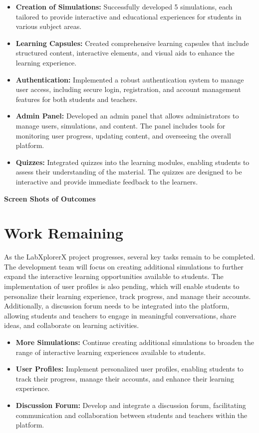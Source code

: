 \begin{itemize}[leftmargin=1cm]
    \item \textbf{Creation of Simulations:} Successfully developed 5 simulations, each tailored to provide interactive and educational experiences for students in various subject areas.
    
    \item \textbf{Learning Capsules:} Created comprehensive learning capsules that include structured content, interactive elements, and visual aids to enhance the learning experience.
    
    \item \textbf{Authentication:} Implemented a robust authentication system to manage user access, including secure login, registration, and account management features for both students and teachers.
    
    \item \textbf{Admin Panel:} Developed an admin panel that allows administrators to manage users, simulations, and content. The panel includes tools for monitoring user progress, updating content, and overseeing the overall platform.
    
    \item \textbf{Quizzes:} Integrated quizzes into the learning modules, enabling students to assess their understanding of the material. The quizzes are designed to be interactive and provide immediate feedback to the learners.
\end{itemize}
\textbf{Screen Shots of Outcomes}

\section{Work Remaining}
As the LabXplorerX project progresses, several key tasks remain to be completed. The development team will focus on creating additional simulations to further expand the interactive learning opportunities available to students. The implementation of user profiles is also pending, which will enable students to personalize their learning experience, track progress, and manage their accounts. Additionally, a discussion forum needs to be integrated into the platform, allowing students and teachers to engage in meaningful conversations, share ideas, and collaborate on learning activities.

\begin{itemize}[leftmargin=1cm]
    \item \textbf{More Simulations:} Continue creating additional simulations to broaden the range of interactive learning experiences available to students.
    
    \item \textbf{User Profiles:} Implement personalized user profiles, enabling students to track their progress, manage their accounts, and enhance their learning experience.
    
    \item \textbf{Discussion Forum:} Develop and integrate a discussion forum, facilitating communication and collaboration between students and teachers within the platform.
\end{itemize}